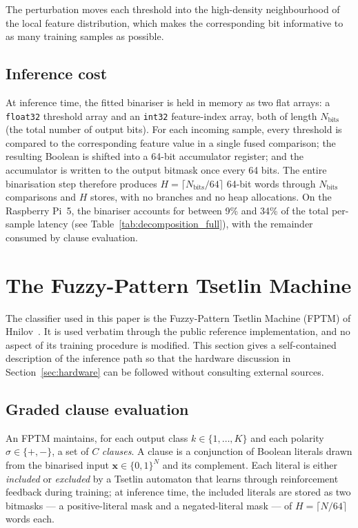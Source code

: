 \documentclass[journal,10pt]{IEEEtran}
\begin{document}
The perturbation moves each threshold into the high-density
neighbourhood of the local feature distribution, which makes the
corresponding bit informative to as many training samples as possible.

\subsection{Inference cost}
\label{sec:glade-infer}

At inference time, the fitted binariser is held in memory as two
flat arrays: a \texttt{float32} threshold array and an \texttt{int32}
feature-index array, both of length $N_\text{bits}$ (the total number
of output bits). For each incoming sample, every threshold is
compared to the corresponding feature value in a single fused
comparison; the resulting Boolean is shifted into a 64-bit
accumulator register; and the accumulator is written to the output
bitmask once every 64 bits. The entire binarisation step therefore
produces $H = \lceil N_\text{bits}/64\rceil$ 64-bit words through
$N_\text{bits}$ comparisons and $H$ stores, with no branches and no
heap allocations. On the Raspberry Pi~5, the binariser accounts for
between 9\% and 34\% of the total per-sample latency (see
Table~\ref{tab:decomposition_full}), with the remainder consumed by
clause evaluation.

\section{The Fuzzy-Pattern Tsetlin Machine}
\label{sec:fptm}

The classifier used in this paper is the Fuzzy-Pattern Tsetlin Machine
(FPTM) of Hnilov~\cite{hnilov2025fuzzy}. It is used verbatim through
the public reference implementation, and no aspect of its training
procedure is modified. This section gives a self-contained description
of the inference path so that the hardware discussion in
Section~\ref{sec:hardware} can be followed without consulting external
sources.

\subsection{Graded clause evaluation}
\label{sec:fptm-clause}

An FPTM maintains, for each output class $k \in \{1,\ldots,K\}$ and
each polarity $\sigma \in \{+,-\}$, a set of $C$ \emph{clauses}. A
clause is a conjunction of Boolean literals drawn from the binarised
input $\mathbf{x} \in \{0,1\}^{N}$ and its complement. Each literal
is either \emph{included} or \emph{excluded} by a Tsetlin automaton
that learns through reinforcement feedback during training; at
inference time, the included literals are stored as two bitmasks ---
a positive-literal mask and a negated-literal mask --- of $H =
\lceil N/64 \rceil$ words each.
\end{document}
